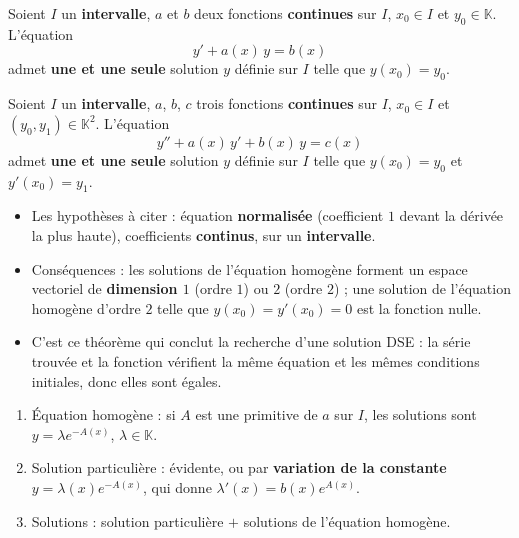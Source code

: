 \documentclass[a4paper,10pt]{article}
\newcommand{\K}{\mathbb{K}}\newcommand{\R}{\mathbb{R}}\newcommand{\C}{\mathbb{C}}\newcommand{\Z}{\mathbb{Z}}
\begin{document}
\begin{PROP}
Soient $I$ un \textbf{intervalle}, $a$ et $b$ deux fonctions \textbf{continues} sur $I$, $x_0\in I$ et $y_0\in\K$. L'équation
\[y'+a(x)\,y=b(x)\]
admet \textbf{une et une seule} solution $y$ définie sur $I$ telle que $y(x_0)=y_0$.
\end{PROP}

\begin{PROP}
Soient $I$ un \textbf{intervalle}, $a$, $b$, $c$ trois fonctions \textbf{continues} sur $I$, $x_0\in I$ et $(y_0,y_1)\in\K^2$. L'équation
\[y''+a(x)\,y'+b(x)\,y=c(x)\]
admet \textbf{une et une seule} solution $y$ définie sur $I$ telle que $y(x_0)=y_0$ et $y'(x_0)=y_1$.
\end{PROP}

\begin{ASTU}
\begin{itemize}
\item Les hypothèses à citer : équation \textbf{normalisée} (coefficient $1$ devant la dérivée la plus haute), coefficients \textbf{continus}, sur un
\textbf{intervalle}.
\item Conséquences : les solutions de l'équation homogène forment un espace vectoriel de \textbf{dimension $1$} (ordre $1$) ou \textbf{$2$}
(ordre $2$) ; une solution de l'équation homogène d'ordre $2$ telle que $y(x_0)=y'(x_0)=0$ est la fonction nulle.
\item C'est ce théorème qui conclut la recherche d'une solution DSE : la série trouvée et la fonction vérifient la même équation et les
mêmes conditions initiales, donc elles sont égales.
\end{itemize}
\end{ASTU}

\begin{FORM}[RÉSOUDRE $y'+a(x)y=b(x)$ SUR UN INTERVALLE]
\begin{enumerate}
\item Équation homogène : si $A$ est une primitive de $a$ sur $I$, les solutions sont $y=\lambda e^{-A(x)}$, $\lambda\in\K$.
\item Solution particulière : évidente, ou par \textbf{variation de la constante} $y=\lambda(x)e^{-A(x)}$, qui donne $\lambda'(x)=b(x)e^{A(x)}$.
\item Solutions : solution particulière $+$ solutions de l'équation homogène.
\end{enumerate}
\end{FORM}
\end{document}
